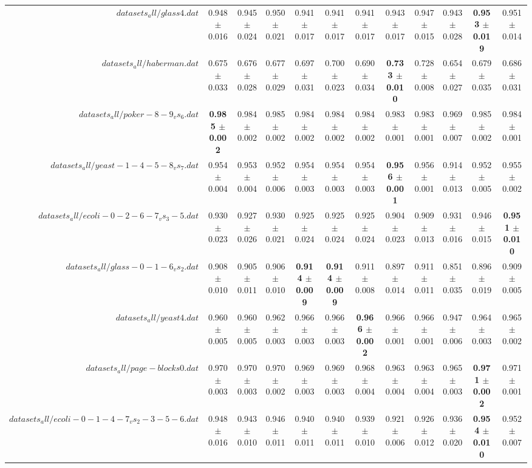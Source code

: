\begin{table}[!ht]
{\begin{tabular}{r c c c c c c c c c c c}
$datasets_all/glass4.dat$ & 0.948 $\pm$ 0.016 & 0.945 $\pm$ 0.024 & 0.950 $\pm$ 0.021 & 0.941 $\pm$ 0.017 & 0.941 $\pm$ 0.017 & 0.941 $\pm$ 0.017 & 0.943 $\pm$ 0.017 & 0.947 $\pm$ 0.015 & 0.943 $\pm$ 0.028 & \textbf{0.953 $\pm$ 0.019} & 0.951 $\pm$ 0.014 \\
$datasets_all/haberman.dat$ & 0.675 $\pm$ 0.033 & 0.676 $\pm$ 0.028 & 0.677 $\pm$ 0.029 & 0.697 $\pm$ 0.031 & 0.700 $\pm$ 0.023 & 0.690 $\pm$ 0.034 & \textbf{0.733 $\pm$ 0.010} & 0.728 $\pm$ 0.008 & 0.654 $\pm$ 0.027 & 0.679 $\pm$ 0.035 & 0.686 $\pm$ 0.031 \\
$datasets_all/poker-8-9_vs_6.dat$ & \textbf{0.985 $\pm$ 0.002} & 0.984 $\pm$ 0.002 & 0.985 $\pm$ 0.002 & 0.984 $\pm$ 0.002 & 0.984 $\pm$ 0.002 & 0.984 $\pm$ 0.002 & 0.983 $\pm$ 0.001 & 0.983 $\pm$ 0.001 & 0.969 $\pm$ 0.007 & 0.985 $\pm$ 0.002 & 0.984 $\pm$ 0.001 \\
$datasets_all/yeast-1-4-5-8_vs_7.dat$ & 0.954 $\pm$ 0.004 & 0.953 $\pm$ 0.004 & 0.952 $\pm$ 0.006 & 0.954 $\pm$ 0.003 & 0.954 $\pm$ 0.003 & 0.954 $\pm$ 0.003 & \textbf{0.956 $\pm$ 0.001} & 0.956 $\pm$ 0.001 & 0.914 $\pm$ 0.013 & 0.952 $\pm$ 0.005 & 0.955 $\pm$ 0.002 \\
$datasets_all/ecoli-0-2-6-7_vs_3-5.dat$ & 0.930 $\pm$ 0.023 & 0.927 $\pm$ 0.026 & 0.930 $\pm$ 0.021 & 0.925 $\pm$ 0.024 & 0.925 $\pm$ 0.024 & 0.925 $\pm$ 0.024 & 0.904 $\pm$ 0.023 & 0.909 $\pm$ 0.013 & 0.931 $\pm$ 0.016 & 0.946 $\pm$ 0.015 & \textbf{0.951 $\pm$ 0.010} \\
$datasets_all/glass-0-1-6_vs_2.dat$ & 0.908 $\pm$ 0.010 & 0.905 $\pm$ 0.011 & 0.906 $\pm$ 0.010 & \textbf{0.914 $\pm$ 0.009} & \textbf{0.914 $\pm$ 0.009} & 0.911 $\pm$ 0.008 & 0.897 $\pm$ 0.014 & 0.911 $\pm$ 0.011 & 0.851 $\pm$ 0.035 & 0.896 $\pm$ 0.019 & 0.909 $\pm$ 0.005 \\
$datasets_all/yeast4.dat$ & 0.960 $\pm$ 0.005 & 0.960 $\pm$ 0.005 & 0.962 $\pm$ 0.003 & 0.966 $\pm$ 0.003 & 0.966 $\pm$ 0.003 & \textbf{0.966 $\pm$ 0.002} & 0.966 $\pm$ 0.001 & 0.966 $\pm$ 0.001 & 0.947 $\pm$ 0.006 & 0.964 $\pm$ 0.003 & 0.965 $\pm$ 0.002 \\
$datasets_all/page-blocks0.dat$ & 0.970 $\pm$ 0.003 & 0.970 $\pm$ 0.003 & 0.970 $\pm$ 0.002 & 0.969 $\pm$ 0.003 & 0.969 $\pm$ 0.003 & 0.968 $\pm$ 0.004 & 0.963 $\pm$ 0.004 & 0.963 $\pm$ 0.004 & 0.965 $\pm$ 0.003 & \textbf{0.971 $\pm$ 0.002} & 0.971 $\pm$ 0.001 \\
$datasets_all/ecoli-0-1-4-7_vs_2-3-5-6.dat$ & 0.948 $\pm$ 0.016 & 0.943 $\pm$ 0.010 & 0.946 $\pm$ 0.011 & 0.940 $\pm$ 0.011 & 0.940 $\pm$ 0.011 & 0.939 $\pm$ 0.010 & 0.921 $\pm$ 0.006 & 0.926 $\pm$ 0.012 & 0.936 $\pm$ 0.020 & \textbf{0.954 $\pm$ 0.010} & 0.952 $\pm$ 0.007 \\

\end{tabular}}
\end{table}
